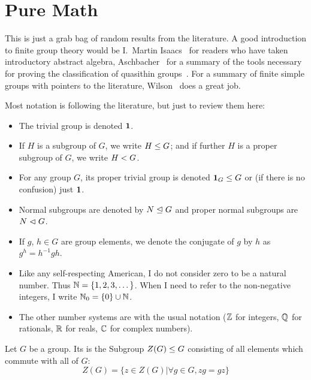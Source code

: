 \chapter{Pure Math}\label{chapter:pure-math}


This is just a grab bag of random results from the literature. A good
introduction to finite group theory would be I.~Martin
Isaacs~\cite{isaacs2008finite} for readers who have taken introductory
abstract algebra, Aschbacher~\cite{aschbacher2000finite} for a summary
of the tools necessary for proving the classification of quasithin groups~\cite{aschbacher2004classification1,aschbacher2004classification2}.
For a summary of finite simple groups with pointers to the literature,
Wilson~\cite{wilson2009finite} does a great job.


\begin{notation}
Most notation is following the literature, but just to
review them here:
\begin{itemize}%
\item The trivial group is denoted $\mathbf{1}$.
\item If $H$ is a subgroup of $G$, we write $H\leq G$; and if
  further $H$ is a proper subgroup of $G$, we write $H< G$.
\item For any group $G$, its proper trivial group is denoted
  $\mathbf{1}_{G}\leq G$ or (if there is no confusion) just
  $\mathbf{1}$.
\item Normal subgroups are denoted by $N\trianglelefteq G$ and proper
  normal subgroups are $N\mathrel{\lhd} G$.
\item If $g$, $h\in G$ are group elements, we denote the conjugate of $g$ by
$h$ as $g^{h}=h^{-1}gh$.
\item Like any self-respecting American, I do not consider zero to be a
natural number. Thus $\mathbb{N}=\{1,2,3,\dots\}$. When I need to refer to the
non-negative integers, I write $\mathbb{N}_{0}=\{0\}\cup\mathbb{N}$.
\item The other number systems are with the usual notation ($\mathbb{Z}$ for
  integers, $\mathbb{Q}$ for rationals, $\mathbb{R}$ for reals, $\mathbb{C}$ for complex numbers).
\end{itemize}
\end{notation}

\begin{definition}
Let $G$ be a group. Its  is the Subgroup $Z(G)\leq G$
consisting of all elements which commute with all of $G$:
\begin{equation*}
Z(G) = \{z\in Z(G) | \forall g\in G, zg=gz\}
\end{equation*}
\end{definition}

